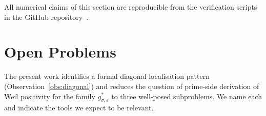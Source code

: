 \documentclass[11pt]{article}
\begin{document}
All numerical claims of this section are reproducible from the
verification scripts in the GitHub repository~\cite{Code}.

\section{Open Problems}
\label{sec:open}

The present work identifies a formal diagonal localisation
pattern (Observation~\ref{obs:diagonal}) and reduces the
question of prime-side derivation of Weil positivity for the
family $g^*_{\sigma,\varepsilon}$ to three well-posed
subproblems.
We name each and indicate the tools we expect to be relevant.
\end{document}
